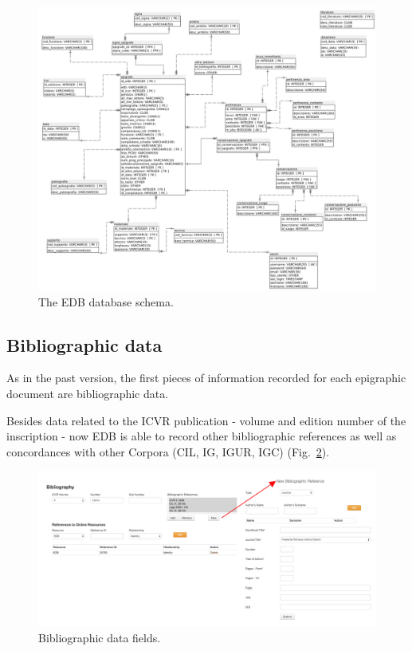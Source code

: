 \documentclass[amsthm,ebook]{saparticle}
\begin{document}
\begin{figure}[hbp]
\centering
 \includegraphics[width=\columnwidth]{EAGLE2016Roccoengrev-img004.png} 
\caption{The EDB database schema.}
\label{fig:4}
\end{figure}




\subsection{Bibliographic data}


As in the past version, the first pieces of information recorded for each epigraphic document are bibliographic data.

Besides data related to the ICVR publication - volume and edition number of the inscription - now EDB is able to record
other bibliographic references as well as concordances with other Corpora (CIL, IG, IGUR, IGC) (Fig.~\ref{fig:3b}). 

\begin{figure}[!hbp]
\centering
 \includegraphics[width=\columnwidth]{Fig4.png}
\caption{Bibliographic data fields.}
\label{fig:3b}
\end{figure}
\end{document}
